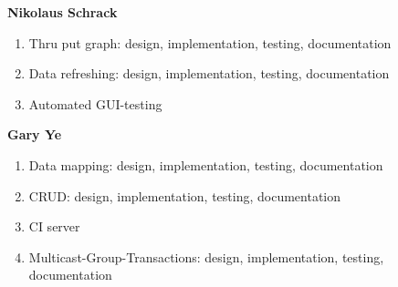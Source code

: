 \documentclass[11pt, a4paper]{article}
\begin{document}
\noindent \textbf{Nikolaus Schrack}
\begin{enumerate}[noitemsep]
	\item Thru put graph: design, implementation, testing, documentation
	\item Data refreshing: design, implementation, testing, documentation
	\item Automated GUI-testing
\end{enumerate}

\noindent \textbf{Gary Ye}
\begin{enumerate}[noitemsep]
	\item Data mapping: design, implementation, testing, documentation
	\item CRUD: design, implementation, testing, documentation
	\item CI server
	\item Multicast-Group-Transactions: design, implementation, testing, documentation
\end{enumerate}
\end{document}
